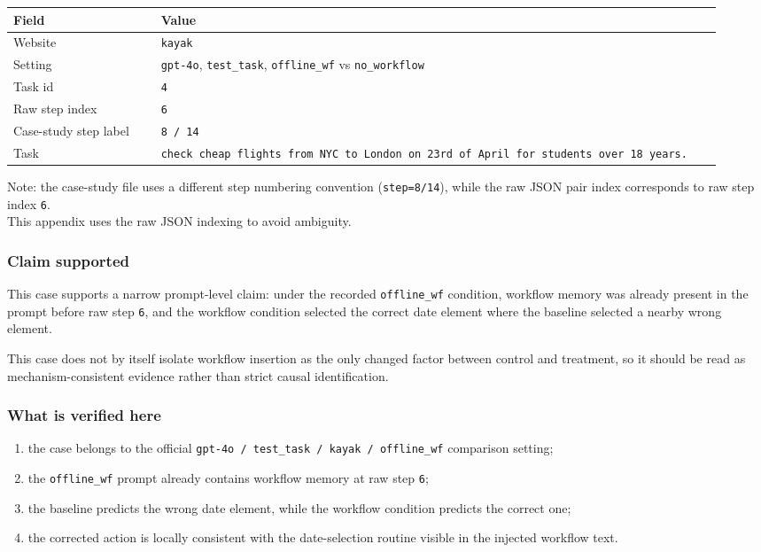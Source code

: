 {\def\LTcaptype{} %
\begin{longtable}[]{@{}>{\raggedright\arraybackslash}p{0.20\linewidth}>{\raggedright\arraybackslash}p{0.76\linewidth}@{}}
\toprule\noalign{}
Field & Value \\
\midrule\noalign{}
\endhead
\bottomrule\noalign{}
\endlastfoot
Website & \texttt{kayak} \\
Setting & \texttt{gpt-4o}, \texttt{test\_task}, \texttt{offline\_wf} vs
\texttt{no\_workflow} \\
Task id & \texttt{4} \\
Raw step index & \texttt{6} \\
Case-study step label & \texttt{8\ /\ 14} \\
Task &
\texttt{check\ cheap\ flights\ from\ NYC\ to\ London\ on\ 23rd\ of\ April\ for\ students\ over\ 18\ years.} \\
\end{longtable}
}

Note: the case-study file uses a different step numbering convention
(\texttt{step=8/14}), while the raw JSON pair index corresponds to raw
step index \texttt{6}.\\
This appendix uses the raw JSON indexing to avoid ambiguity.

\subsubsection{Claim supported}

This case supports a narrow prompt-level claim: under the recorded
\texttt{offline\_wf} condition, workflow memory was already present in
the prompt before raw step \texttt{6}, and the workflow condition
selected the correct date element where the baseline selected a nearby
wrong element.

This case does not by itself isolate workflow insertion as the only
changed factor between control and treatment, so it should be read as
mechanism-consistent evidence rather than strict causal identification.

\subsubsection{What is verified here}

\begin{enumerate}
\def\labelenumi{\arabic{enumi}.}
\tightlist
\item the case belongs to the official \texttt{gpt-4o / test\_task / kayak / offline\_wf} comparison setting;
\item the \texttt{offline\_wf} prompt already contains workflow memory at raw step \texttt{6};
\item the baseline predicts the wrong date element, while the workflow condition predicts the correct one;
\item the corrected action is locally consistent with the date-selection routine visible in the injected workflow text.
\end{enumerate}

